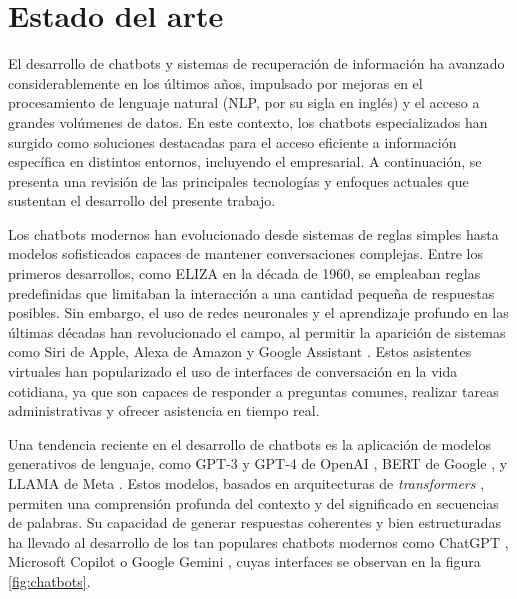 \vspace{15mm}

\section{Estado del arte}

El desarrollo de chatbots y sistemas de recuperación de información ha avanzado considerablemente en los últimos años, 
impulsado por mejoras en el procesamiento de lenguaje natural (NLP, por su sigla en inglés) y el acceso a grandes volúmenes de datos. 
En este contexto, los chatbots especializados han surgido como soluciones destacadas para el acceso eficiente 
a información específica en distintos entornos, incluyendo el empresarial. A continuación, se presenta una revisión 
de las principales tecnologías y enfoques actuales que sustentan el desarrollo del presente trabajo.

Los chatbots modernos han evolucionado desde sistemas de reglas simples hasta modelos sofisticados capaces de 
mantener conversaciones complejas. Entre los primeros desarrollos, como ELIZA \citep{paper:eliza} en 
la década de 1960, se empleaban reglas predefinidas que limitaban la interacción a una cantidad pequeña de 
respuestas posibles. Sin embargo, el uso de redes neuronales y el aprendizaje profundo en las últimas décadas 
han revolucionado el campo, al permitir la aparición de sistemas como Siri de Apple, Alexa de Amazon 
y Google Assistant \citep{article:voice-assistants}. Estos asistentes virtuales han popularizado el uso de interfaces 
de conversación en la vida cotidiana, ya que son capaces de responder a preguntas comunes, realizar tareas administrativas 
y ofrecer asistencia en tiempo real.

Una tendencia reciente en el desarrollo de chatbots es la aplicación de modelos generativos de lenguaje, como GPT-3 y GPT-4 
de OpenAI \citep{paper:gpt}, BERT de Google \citep{paper:bert}, y LLAMA de Meta \citep{paper:llama}. Estos modelos, basados 
en arquitecturas de \textit{transformers} \citep{paper:transformers}, permiten una comprensión profunda del contexto y del 
significado en secuencias de palabras. Su capacidad de generar respuestas coherentes y bien estructuradas ha llevado al 
desarrollo de los tan populares chatbots modernos como ChatGPT \citep{website:chatgpt}, Microsoft Copilot \citep{website:copilot}
o Google Gemini \citep{website:gemini}, cuyas interfaces se observan en la figura \ref{fig:chatbots}.

